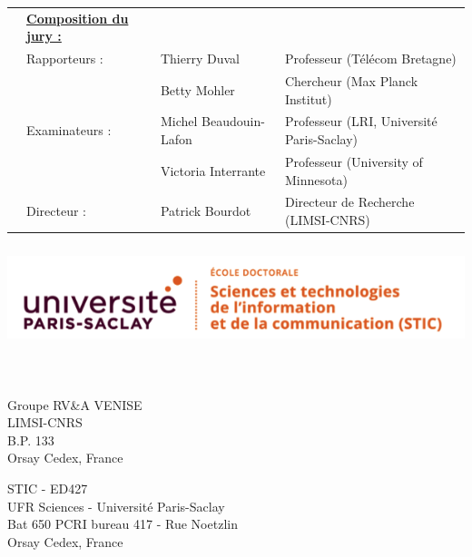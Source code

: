 \begin{titlepage}
\begin{center}
  \begin{tabular}{p{0cm} p{3.6cm} p{4.5cm} l }
    & \footnotesize\bf\underline{Composition du jury :}& &\\
    & \footnotesize{Rapporteurs} : 	& Thierry Duval	& \footnotesize{Professeur (Télécom Bretagne)} \\	
    &							&  Betty Mohler		& \footnotesize{Chercheur (Max Planck Institut)} \\
    & \footnotesize{Examinateurs} : 	& Michel Beaudouin-Lafon & \footnotesize{Professeur (LRI, Universit\'e Paris-Saclay)} \\
    &             & Victoria Interrante & \footnotesize{Professeur (University of Minnesota)} \\
    & \footnotesize{Directeur} :	& Patrick Bourdot & \footnotesize{Directeur de Recherche (LIMSI-CNRS)} \\
  \end{tabular}
\end{center}

\clearpage
\newpage

\includegraphics[height=3.0cm]{./logos/logo_stic}\hfill

\thispagestyle{empty}   

\mbox{~} %

\vfill 

\setlength{\columnsep}{7mm}
\setlength{\columnseprule}{0pt}

\begin{multicols}{2} 
\small 
\noindent Groupe RV\&A VENISE 	\\	
\noindent LIMSI-CNRS					\\
\noindent B.P. 133				\\
 Orsay Cedex, France \\	

\columnbreak

\raggedleft STIC - ED427 \\
\noindent UFR Sciences - Université Paris-Saclay \\
\noindent Bat 650 PCRI bureau 417 - Rue Noetzlin  \\
 Orsay Cedex, France
\end{multicols}

\end{titlepage}